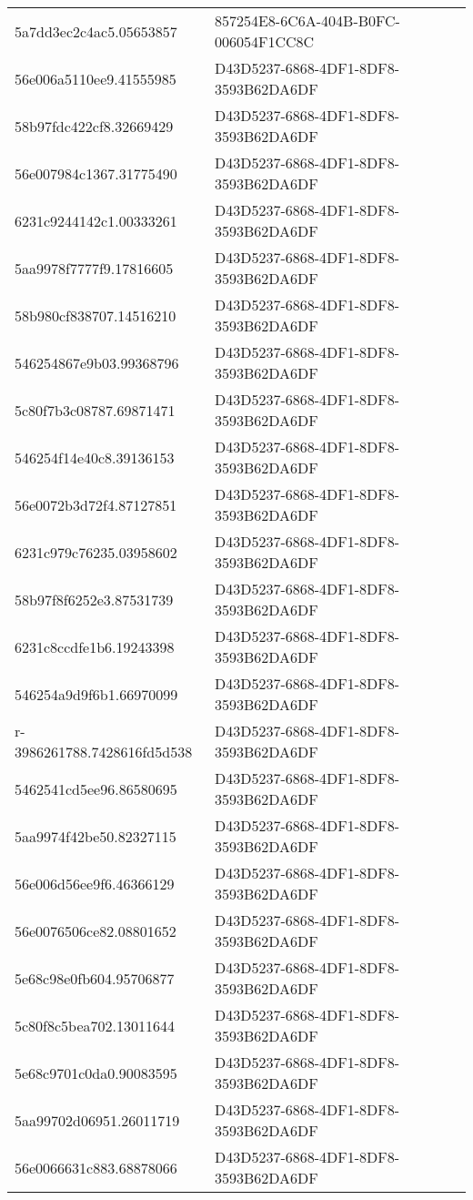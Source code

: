 \begin{tabular}{ll}
5a7dd3ec2c4ac5.05653857 & 857254E8-6C6A-404B-B0FC-006054F1CC8C \\
56e006a5110ee9.41555985 & D43D5237-6868-4DF1-8DF8-3593B62DA6DF \\
58b97fdc422cf8.32669429 & D43D5237-6868-4DF1-8DF8-3593B62DA6DF \\
56e007984c1367.31775490 & D43D5237-6868-4DF1-8DF8-3593B62DA6DF \\
6231c9244142c1.00333261 & D43D5237-6868-4DF1-8DF8-3593B62DA6DF \\
5aa9978f7777f9.17816605 & D43D5237-6868-4DF1-8DF8-3593B62DA6DF \\
58b980cf838707.14516210 & D43D5237-6868-4DF1-8DF8-3593B62DA6DF \\
546254867e9b03.99368796 & D43D5237-6868-4DF1-8DF8-3593B62DA6DF \\
5c80f7b3c08787.69871471 & D43D5237-6868-4DF1-8DF8-3593B62DA6DF \\
546254f14e40c8.39136153 & D43D5237-6868-4DF1-8DF8-3593B62DA6DF \\
56e0072b3d72f4.87127851 & D43D5237-6868-4DF1-8DF8-3593B62DA6DF \\
6231c979c76235.03958602 & D43D5237-6868-4DF1-8DF8-3593B62DA6DF \\
58b97f8f6252e3.87531739 & D43D5237-6868-4DF1-8DF8-3593B62DA6DF \\
6231c8ccdfe1b6.19243398 & D43D5237-6868-4DF1-8DF8-3593B62DA6DF \\
546254a9d9f6b1.66970099 & D43D5237-6868-4DF1-8DF8-3593B62DA6DF \\
r-3986261788.7428616fd5d538 & D43D5237-6868-4DF1-8DF8-3593B62DA6DF \\
5462541cd5ee96.86580695 & D43D5237-6868-4DF1-8DF8-3593B62DA6DF \\
5aa9974f42be50.82327115 & D43D5237-6868-4DF1-8DF8-3593B62DA6DF \\
56e006d56ee9f6.46366129 & D43D5237-6868-4DF1-8DF8-3593B62DA6DF \\
56e0076506ce82.08801652 & D43D5237-6868-4DF1-8DF8-3593B62DA6DF \\
5e68c98e0fb604.95706877 & D43D5237-6868-4DF1-8DF8-3593B62DA6DF \\
5c80f8c5bea702.13011644 & D43D5237-6868-4DF1-8DF8-3593B62DA6DF \\
5e68c9701c0da0.90083595 & D43D5237-6868-4DF1-8DF8-3593B62DA6DF \\
5aa99702d06951.26011719 & D43D5237-6868-4DF1-8DF8-3593B62DA6DF \\
56e0066631c883.68878066 & D43D5237-6868-4DF1-8DF8-3593B62DA6DF \\

\end{tabular}
